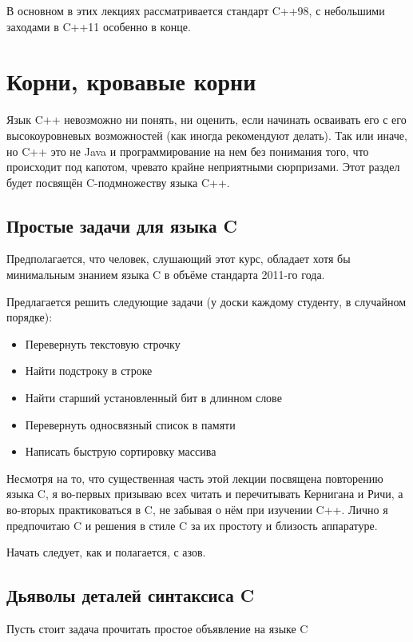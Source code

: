 \documentclass[a4paper,12pt,oneside]{article}
\begin{document}
В основном в этих лекциях рассматривается стандарт C++98, с небольшими заходами в C++11 особенно в конце.

\pagebreak
\section{Корни, кровавые корни}\label{BloodyRoots}

Язык C++ невозможно ни понять, ни оценить, если начинать осваивать его с его высокоуровневых возможностей (как иногда рекомендуют делать). Так или иначе, но C++ это не Java и программирование на нем без понимания того, что происходит под капотом, чревато крайне неприятными сюрпризами. Этот раздел будет посвящён C-подмножеству языка C++.

\subsection{Простые задачи для языка C}\label{SimpleTasks}

Предполагается, что человек, слушающий этот курс, обладает хотя бы минимальным знанием языка C в объёме стандарта 2011-го года.

Предлагается решить следующие задачи (у доски каждому студенту, в случайном порядке):

\begin{itemize}
\item
Перевернуть текстовую строчку
\item
Найти подстроку в строке
\item
Найти старший установленный бит в длинном слове
\item
Перевернуть односвязный список в памяти
\item
Написать быструю сортировку массива
\end{itemize}

Несмотря на то, что существенная часть этой лекции посвящена повторению языка C, я во-первых призываю всех читать и перечитывать Кернигана и Ричи, а во-вторых практиковаться в C, не забывая о нём при изучении C++. Лично я предпочитаю C и решения в стиле C за их простоту и близость аппаратуре.

Начать следует, как и полагается, с азов.

\subsection{Дьяволы деталей синтаксиса C}\label{DevilDetails}

Пусть стоит задача прочитать простое объявление на языке C
\end{document}
